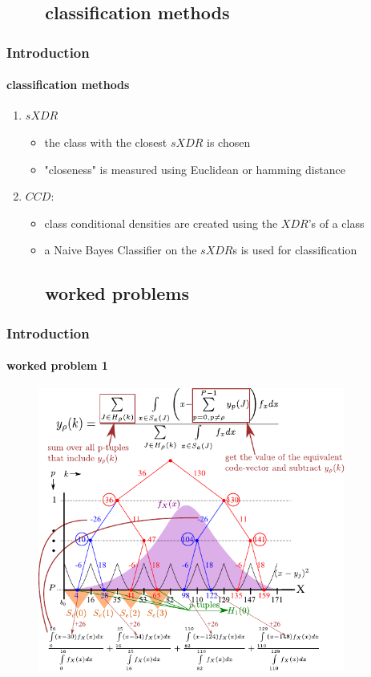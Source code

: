 \subsection{\ \ \ \ classification methods}
\begin{frame}
\frametitle{Introduction}
\framesubtitle{classification methods}
\logoCSIPCPL\mypagenum
	\begin{enumerate}
		\item {\color{blue} $sXDR$}
			\begin{itemize}  
				\item the class with the closest $sXDR$ is chosen
				\item "closeness" is measured using Euclidean or hamming distance
			\end{itemize}
		\item {\color{blue} $CCD$}:  
			\begin{itemize}
				\item class conditional densities are created using the $XDR$'s of a class
				\item a Naive Bayes Classifier on the $sXDR$s is used for classification
			\end{itemize}
	\end{enumerate}
\end{frame}

\subsection{\ \ \ \ worked problems}

\begin{frame}[plain]
\frametitle{Introduction}
\framesubtitle{worked problem 1}
\logoCSIPCPL\mypagenum
	\begin{changemargin}{-1.3in}{0in}
		\begin{figure}				
			\includegraphics[width=0.9\textwidth]{figs/RVQ_stagewise_example.pdf}
			\label{fig:RVQ_SQ_DMSE}
		\end{figure}
	\end{changemargin}
\end{frame}



